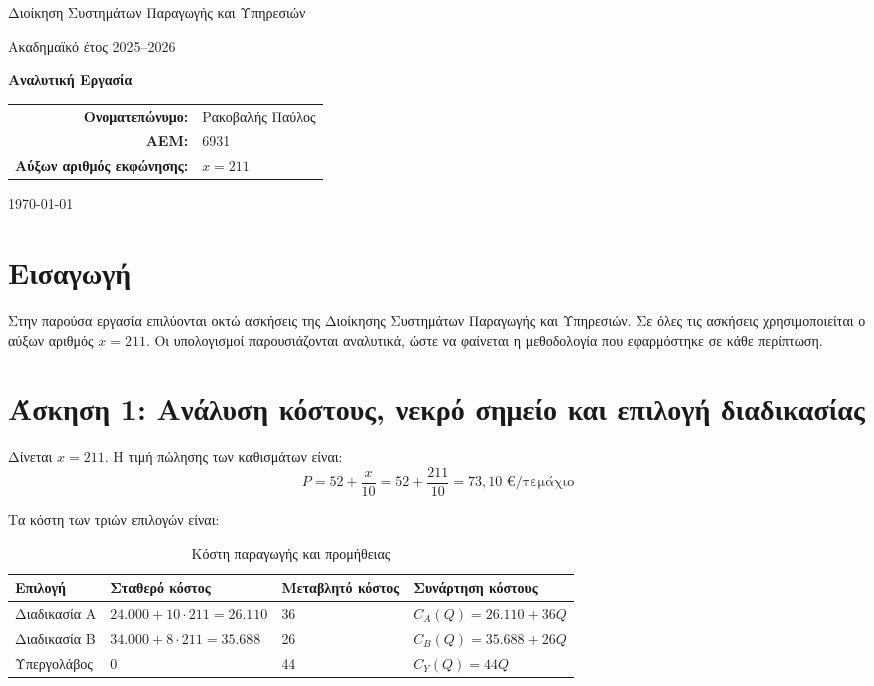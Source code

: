\documentclass[12pt,a4paper]{article}
\newcommand{\studentname}{Ρακοβαλής Παύλος}
\newcommand{\studentid}{6931}
\newcommand{\xvalue}{211}
\begin{document}
\begin{titlepage}
    \centering
    \vspace*{2cm}

    {\Large Διοίκηση Συστημάτων Παραγωγής και Υπηρεσιών\par}
    \vspace{0.4cm}
    {\large Ακαδημαϊκό έτος 2025--2026\par}

    \vspace{2.2cm}
    {\Huge \textbf{Αναλυτική Εργασία}\par}

    \vspace{2.2cm}
    \begin{tabular}{rl}
        \textbf{Ονοματεπώνυμο:} & \studentname \\
        \textbf{ΑΕΜ:} & \studentid \\
        \textbf{Αύξων αριθμός εκφώνησης:} & \(x = \xvalue\)
    \end{tabular}

    \vfill
    {\large \today\par}
\end{titlepage}

\tableofcontents
\newpage

\section*{Εισαγωγή}

Στην παρούσα εργασία επιλύονται οκτώ ασκήσεις της Διοίκησης Συστημάτων Παραγωγής και Υπηρεσιών. Σε όλες τις ασκήσεις χρησιμοποιείται ο αύξων αριθμός \(x = 211\). Οι υπολογισμοί παρουσιάζονται αναλυτικά, ώστε να φαίνεται η μεθοδολογία που εφαρμόστηκε σε κάθε περίπτωση.

\newpage

\section{Άσκηση 1: Ανάλυση κόστους, νεκρό σημείο και επιλογή διαδικασίας}

Δίνεται \(x = 211\). Η τιμή πώλησης των καθισμάτων είναι:
\[
P = 52 + \frac{x}{10} = 52 + \frac{211}{10} = 73{,}10 \text{ €/τεμάχιο}
\]

Τα κόστη των τριών επιλογών είναι:

\begin{table}[H]
\centering
\caption{Κόστη παραγωγής και προμήθειας}
\small
\begin{tabular}{p{2.7cm}p{3.9cm}p{2.7cm}p{4.1cm}}
\toprule
\textbf{Επιλογή} & \textbf{Σταθερό κόστος} & \textbf{Μεταβλητό κόστος} & \textbf{Συνάρτηση κόστους} \\
\midrule
Διαδικασία Α & \(24.000 + 10 \cdot 211 = 26.110\) & 36 & \(C_A(Q)=26.110+36Q\) \\
Διαδικασία Β & \(34.000 + 8 \cdot 211 = 35.688\) & 26 & \(C_B(Q)=35.688+26Q\) \\
Υπεργολάβος & 0 & 44 & \(C_Y(Q)=44Q\) \\
\bottomrule
\end{tabular}
\end{table}
\end{document}
